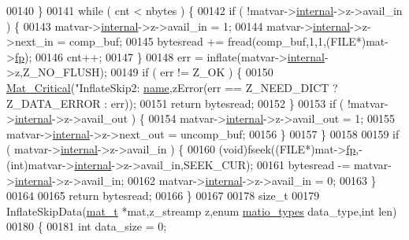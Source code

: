 \begin{DoxyCode}
{{{00140     \}
00141     \textcolor{keywordflow}{while} ( cnt < nbytes ) \{
00142         \textcolor{keywordflow}{if} ( !matvar->\hyperlink{group___m_a_t_a6e97e3ed9f40c49322c18561c2a94e92}{internal}->z->avail\_in ) \{
00143             matvar->\hyperlink{group___m_a_t_a6e97e3ed9f40c49322c18561c2a94e92}{internal}->z->avail\_in = 1;
00144             matvar->\hyperlink{group___m_a_t_a6e97e3ed9f40c49322c18561c2a94e92}{internal}->z->next\_in = comp\_buf;
00145             bytesread += fread(comp\_buf,1,1,(FILE*)mat->\hyperlink{struct__mat__t_a85f562e407ca9ad4d2a6e14f839432b7}{fp});
00146             cnt++;
00147         \}
00148         err = inflate(matvar->\hyperlink{group___m_a_t_a6e97e3ed9f40c49322c18561c2a94e92}{internal}->z,Z\_NO\_FLUSH);
00149         \textcolor{keywordflow}{if} ( err != Z\_OK ) \{
00150             \hyperlink{group__mat__util_gaf51f2bfbb5580f575e4dd79757e2b80c}{Mat\_Critical}(\textcolor{stringliteral}{"InflateSkip2: %
      \hyperlink{group___m_a_t_a5d4b55b041e3b4fb50c04337f05ad909}{name},zError(err == Z\_NEED\_DICT ? Z\_DATA\_ERROR : err));
00151             \textcolor{keywordflow}{return} bytesread;
00152         \}
00153         \textcolor{keywordflow}{if} ( !matvar->\hyperlink{group___m_a_t_a6e97e3ed9f40c49322c18561c2a94e92}{internal}->z->avail\_out ) \{
00154             matvar->\hyperlink{group___m_a_t_a6e97e3ed9f40c49322c18561c2a94e92}{internal}->z->avail\_out = 1;
00155             matvar->\hyperlink{group___m_a_t_a6e97e3ed9f40c49322c18561c2a94e92}{internal}->z->next\_out = uncomp\_buf;
00156         \}
00157     \}
00158 
00159     \textcolor{keywordflow}{if} ( matvar->\hyperlink{group___m_a_t_a6e97e3ed9f40c49322c18561c2a94e92}{internal}->z->avail\_in ) \{
00160         (void)fseek((FILE*)mat->\hyperlink{struct__mat__t_a85f562e407ca9ad4d2a6e14f839432b7}{fp},-(int)matvar->\hyperlink{group___m_a_t_a6e97e3ed9f40c49322c18561c2a94e92}{internal}->z->avail\_in,SEEK\_CUR);
00161         bytesread -= matvar->\hyperlink{group___m_a_t_a6e97e3ed9f40c49322c18561c2a94e92}{internal}->z->avail\_in;
00162         matvar->\hyperlink{group___m_a_t_a6e97e3ed9f40c49322c18561c2a94e92}{internal}->z->avail\_in = 0;
00163     \}
00164 
00165     \textcolor{keywordflow}{return} bytesread;
00166 \}
00167 
00178 \textcolor{keywordtype}{size\_t}
00179 InflateSkipData(\hyperlink{struct__mat__t}{mat\_t} *mat,z\_streamp z,\textcolor{keyword}{enum} \hyperlink{group___m_a_t_gacf7b3b879282b7ab3a51190e49bf3453}{matio\_types} data\_type,\textcolor{keywordtype}{int} len)
00180 \{
00181     \textcolor{keywordtype}{int} data\_size = 0;
}}}}
\end{DoxyCode}
